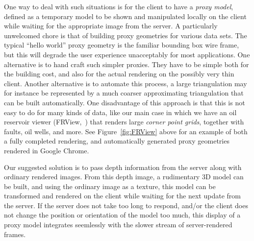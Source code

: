 
One way to deal with such situations is for the client to have a {\em proxy
model}, defined as a temporary model to be shown and manipulated locally on the
client while waiting for the appropriate image from the server.  A particularly
unwelcomed chore is that of building proxy geometries for various data sets. The
typical ``hello world'' proxy geometry is the familiar bounding box wire frame,
but this will degrade the user experience unacceptably for most
applications. One alternative is to hand craft such simpler proxies. They have
to be simple both for the building cost, and also for the actual rendering on
the possibly very thin client. Another alternative is to automate this process,
a large triangulation may for instance be represented by a much coarser
approximating triangulation that can be built automatically. One disadvantage of
this approach is that this is not easy to do for many kinds of data, like our
main case in which we have an oil reservoir viewer (FRView,~\cite{cloudviz})
that renders large {\em corner point grids}, together with faults, oil wells,
and more. See Figure~\ref{fig:FRView} above for an example of both a fully
completed rendering, and automatically generated proxy geometries rendered in
Google Chrome.

Our suggested solution is to pass depth information from the server along with
ordinary rendered images. From this depth image, a rudimentary 3D model can be
built, and using the ordinary image as a texture, this model can be transformed
and rendered on the client while waiting for the next update from the server. If
the server does not take too long to respond, and/or the client does not change
the position or orientation of the model too much, this display of a proxy model
integrates seemlessly with the slower stream of server-rendered frames.

